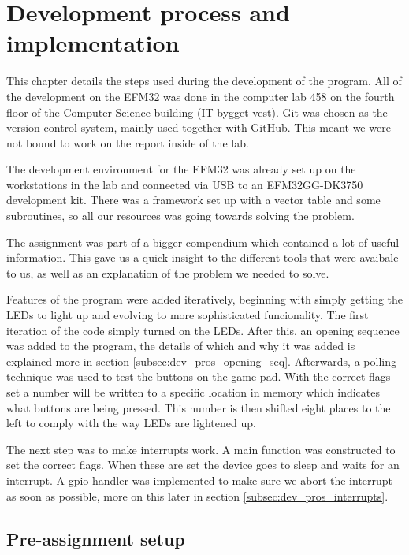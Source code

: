 \section{Development process and implementation}
\label{chap:development_process}

This chapter details the steps used during the development of the program. All of the development on the EFM32 was done in the computer lab 458 on the fourth floor of the Computer Science building (IT-bygget vest). Git was chosen as the version control system, mainly used together with GitHub. This meant we were not bound to work on the report inside of the lab.

The development environment for the EFM32 was already set up on the workstations in the lab and connected via USB to an EFM32GG-DK3750 development kit. There was a framework set up with a vector table and some subroutines, so all our resources was going towards solving the problem.

The assignment was part of a bigger compendium \cite{eeds-compendium} which contained a lot of useful information. This gave us a quick insight to the different tools that were avaibale to us, as well as an explanation of the problem we needed to solve.

Features of the program were added iteratively, beginning with simply getting the LEDs to light up and evolving to more sophisticated funcionality. The first iteration of the code simply turned on the LEDs. After this, an opening sequence was added to the program, the details of which and why it was added is explained more in section \ref{subsec:dev_pros_opening_seq}. Afterwards, a polling technique was used to test the buttons on the game pad. With the correct flags set a number will be written to a specific location in memory which indicates what buttons are being pressed. This number is then shifted eight places to the left to comply with the way LEDs are lightened up.

The next step was to make interrupts work. A main function was constructed to set the correct flags. When these are set the device goes to sleep and waits for an interrupt. A gpio handler was implemented to make sure we abort the interrupt as soon as possible, more on this later in section \ref{subsec:dev_pros_interrupts}.

\subsection{Pre-assignment setup}
\label{subsec:pre-assingment_setup}

